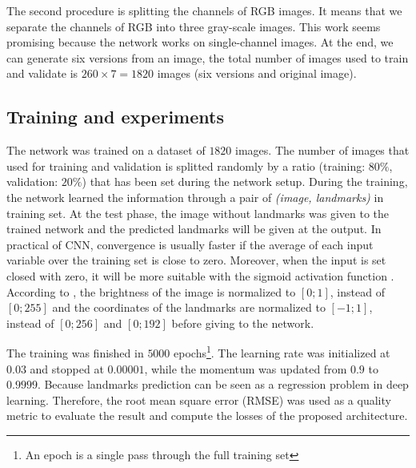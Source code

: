 \documentclass[10pt]{article}
\begin{document}
The second procedure is splitting the channels of RGB
images. It means that we separate the channels of RGB into
three gray-scale images. This work seems promising because
the network works on single-channel images. At the end, we
can generate six versions from an image, the total number of
images used to train and validate is $260 \times 7 = 1820$ images
(six versions and original image).

\subsection{Training and experiments}
The network was trained on a dataset of $1820$ images. The number of images that
used for training and validation is splitted randomly by a ratio
(training: $80\%$, validation: $20\%$) that has been set during the
network setup. During the training, the network learned the information through a pair of \textit{(image, landmarks)} in training set. At the test phase, the image without landmarks was given to the trained network and the predicted landmarks will be given at the output. In practical of CNN, convergence is
usually faster if the average of each input variable over the
training set is close to zero. Moreover, when the input is set
closed with zero, it will be more suitable with the sigmoid
activation function \cite{lecun2012efficient}. According to \cite{lecun2012efficient}, the brightness of
the image is normalized to $[0; 1]$, instead of $[0; 255]$ and the
coordinates of the landmarks are normalized to $[-1; 1]$, instead
of $[0; 256]$ and $[0; 192]$ before giving to the network.

The training was finished in $5000$ epochs\footnote{An epoch is a single pass through the full training set}. The learning rate was initialized at $0.03$ and stopped at $0.00001$, while the momentum was updated from $0.9$ to $0.9999$. 
Because landmarks prediction can be seen as a regression problem in deep learning. Therefore, the root mean square error (RMSE) was used as a quality metric to evaluate the result and compute the losses of the proposed architecture.
\end{document}
